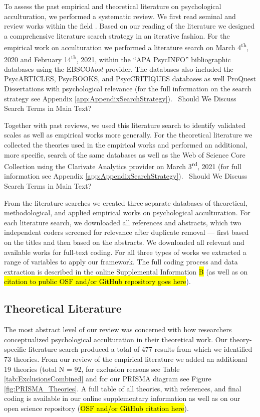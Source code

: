 To assess the past empirical and theoretical literature on psychological
acculturation, we performed a systematic review. We first read seminal
and review works within the field
\citep[including,][]{Ward2019, Berry1997b, Berry2003, Szapocznik1978, Sam2006a, Rudmin2003a}.
Based on our reading of the literature we designed a comprehensive
literature search strategy in an iterative fashion. For the empirical
work on acculturation we performed a literature search on March
4\textsuperscript{th}, 2020 and February 14\textsuperscript{th}, 2021,
within the ``APA PsycINFO'' bibliographic databases using the
EBSCO\textit{host} provider. The databases also included the
PsycARTICLES, PsycBOOKS, and PsycCRITIQUES databases as well ProQuest
Dissertations with psychological relevance (for the full information on
the search strategy see Appendix \ref{app:AppendixSearchStrategy}).
\Warning~Should We Discuss Search Terms in Main Text? \Warning

Together with past reviews, we used this literature search to identify
validated scales as well as empirical works more generally. For the
theoretical literature we collected the theories used in the empirical
works and performed an additional, more specific, search of the same
databases as well as the Web of Science Core Collection using the
Clarivate Analytics provider on March 3\textsuperscript{rd}, 2021 (for
full information see Appendix \ref{app:AppendixSearchStrategy}).
\Warning~Should We Discuss Search Terms in Main Text? \Warning~

From the literature searches we created three separate databases of
theoretical, methodological, and applied empirical works on
psychological acculturation. For each literature search, we downloaded
all references and abstracts, which two independent coders screened for
relevance after duplicate removal --- first based on the titles and then
based on the abstracts. We downloaded all relevant and available works
for full-text coding. For all three types of works we extracted a range
of variables to apply our framework. The full coding process and data
extraction is described in the online Supplemental Information \hl{B}
(as well as on
\hl{citation to public OSF and/or GitHub repository goes here}).

\subsection{Theoretical Literature}

The most abstract level of our review was concerned with how researchers
conceptualized psychological acculturation in their theoretical work.
Our theory-specific literature search produced a total of 477 results
from which we identified 73 theories. From our review of the empirical
literature we added an additional 19 theories (total N = 92, for
exclusion reasons see Table \ref{tab:ExclusionsCombined} and for our
PRISMA diagram see Figure \ref{fig:PRISMA_Theories}. A full table of all
theories, with references, and final coding is available in our online
supplementary information as well as on our open science repository
(\hl{OSF and/or GitHub citation here}).

